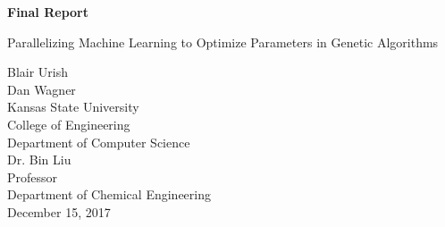 \documentclass[letterpaper, 12pt]{article}
\begin{document}
\begin{titlepage}
\centering
	\vspace*{5.75cm}
	{\huge\bfseries Final Report\par}
	{\large Parallelizing Machine Learning to Optimize Parameters in Genetic Algorithms\par}
	\vspace{2cm}
	Blair Urish\\
	Dan Wagner\\
	Kansas State University\\
	College of Engineering\\
	Department of Computer Science\\
	\vspace{1cm}
	Dr. Bin Liu\\
	Professor\\
	Department of Chemical Engineering\\
	\vspace{1cm}
	December 15, 2017
\end{titlepage}

\begin{abstract}
\thispagestyle{plain}
\begin{flushleft}
	It is difficult for traditional materials to have some desirable traits that often conflict with one another.  Hybrid materials are crafted to solve this, but the compounds are difficult to identify.  Using machine learning and genetic algorithms to locate the traits of these compounds has had success but is inefficient in computing power.  Thus, we have parallelized the process by distributing the work across several nodes in a master-slave relationship.  This method allowed the computation time to be spread across chunks of data, and resulted in an overall lower run time.
\end{flushleft}
\end{abstract}
\end{document}
